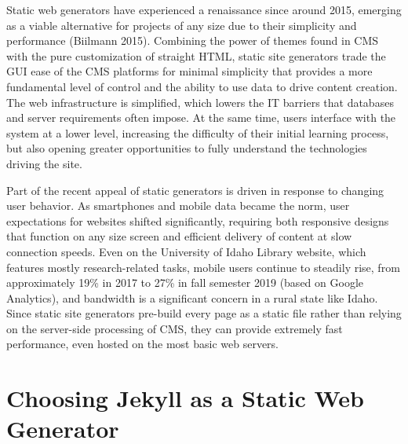 \documentclass{book}
\begin{document}
Static web generators have experienced a renaissance since around 2015,
emerging as a viable alternative for projects of any size due to their
simplicity and performance (Biilmann 2015). Combining the power of themes
found in CMS with the pure customization of straight HTML, static site
generators trade the GUI ease of the CMS platforms for minimal simplicity that
provides a more fundamental level of control and the ability to use data to
drive content creation. The web infrastructure is simplified, which lowers the
IT barriers that databases and server requirements often impose. At the same
time, users interface with the system at a lower level, increasing the
difficulty of their initial learning process, but also opening greater
opportunities to fully understand the technologies driving the site.

Part of the recent appeal of static generators is driven in response to
changing user behavior. As smartphones and mobile data became the norm, user
expectations for websites shifted significantly, requiring both responsive
designs that function on any size screen and efficient delivery of content at
slow connection speeds. Even on the University of Idaho Library website, which
features mostly research-related tasks, mobile users continue to steadily
rise, from approximately 19\% in 2017 to 27\% in fall semester 2019 (based on
Google Analytics), and bandwidth is a significant concern in a rural state
like Idaho. Since static site generators pre-build every page as a static file
rather than relying on the server-side processing of CMS, they can provide
extremely fast performance, even hosted on the most basic web servers.

\hypertarget{choosing-jekyll-as-a-static-web-generator}{%
\section{Choosing Jekyll as a Static Web
Generator}\label{choosing-jekyll-as-a-static-web-generator}}
\end{document}

